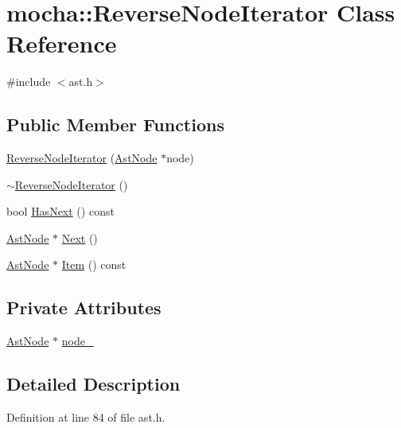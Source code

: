 \hypertarget{classmocha_1_1_reverse_node_iterator}{
\section{mocha::ReverseNodeIterator Class Reference}
\label{classmocha_1_1_reverse_node_iterator}
}


{\ttfamily \#include $<$ast.h$>$}

\subsection*{Public Member Functions}
\begin{DoxyCompactItemize}
\item 
\hyperlink{classmocha_1_1_reverse_node_iterator_a77ac6539a84601446045cba78cccc3a6}{ReverseNodeIterator} (\hyperlink{classmocha_1_1_ast_node}{AstNode} $\ast$node)
\item 
\hyperlink{classmocha_1_1_reverse_node_iterator_aefb1d5d9738638caca436e26a04b4962}{$\sim$ReverseNodeIterator} ()
\item 
bool \hyperlink{classmocha_1_1_reverse_node_iterator_a65b054fa8292fc3464f01f6f00e01350}{HasNext} () const 
\item 
\hyperlink{classmocha_1_1_ast_node}{AstNode} $\ast$ \hyperlink{classmocha_1_1_reverse_node_iterator_aa64148fc6f2c5f40d32edafa9d8e1e1a}{Next} ()
\item 
\hyperlink{classmocha_1_1_ast_node}{AstNode} $\ast$ \hyperlink{classmocha_1_1_reverse_node_iterator_a8520e95260558a353133891f637f4923}{Item} () const 
\end{DoxyCompactItemize}
\subsection*{Private Attributes}
\begin{DoxyCompactItemize}
\item 
\hyperlink{classmocha_1_1_ast_node}{AstNode} $\ast$ \hyperlink{classmocha_1_1_reverse_node_iterator_a84873356a6ecaf89e595e85efd514dd3}{node\_\-}
\end{DoxyCompactItemize}


\subsection{Detailed Description}


Definition at line 84 of file ast.h.



